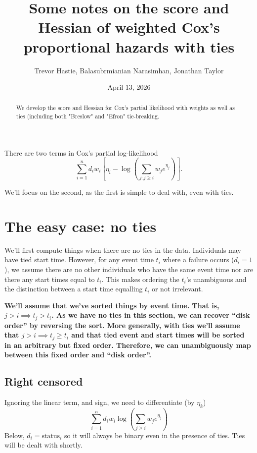 \documentclass{article}
\title{Some notes on the score and Hessian of weighted Cox's proportional hazards with ties}
\author{Trevor Hastie, Balasubrmianian Narasimhan, Jonathan Taylor} %
\date{April 13, 2026}
\begin{document}
\maketitle

\begin{abstract}
We develop the score and Hessian
for Cox's partial likelihood
with weights as well as ties (including
both "Breslow" and "Efron" tie-breaking.
\end{abstract}

There are two terms in Cox's partial log-likelihood
$$
\sum_{i=1}^n d_i w_i \left[ \eta_i - \log \left(\sum_{j:j \geq i} w_j e^{\eta_j} \right) \right].
$$

We'll focus on the second, as the first is simple
to deal with, even with ties.


\section{The easy case: no ties}

We'll first compute things when there are no ties
in the data. Individuals may have tied
start time. However, for any event time $t_i$ where
a failure occurs ($d_i=1$), we assume there are no
other individuals who have the same event time
nor are there any start times equal to $t_i$. 
This makes ordering the $t_i$'s unambiguous and 
the distinction between a start time equalling $t_i$ or not irrelevant.

{\bf We'll assume that we've sorted things
by event time. That is, $j > i \implies t_j > t_i$. As
we have no ties in this section, we can recover ``disk order''
by reversing the sort. More generally, with ties we'll assume that
$j > i \implies t_j \geq t_i$ and that tied event and start times
will be sorted in an arbitrary but fixed order. Therefore, we can unambiguously map between this fixed order and ``disk order''.}

\subsection{Right censored}

Ignoring the linear term, and sign,  we need to differentiate (by $\eta_k$)
\begin{equation}
   \sum_{i = 1}^n d_i w_i \log \left(\sum_{j \geq i} w_j e^{\eta_j}\right)
\end{equation}
Below, $d_i=\text{status}_i$ so it will always be binary even in the presence of ties. Ties will be dealt with shortly.
\end{document}
